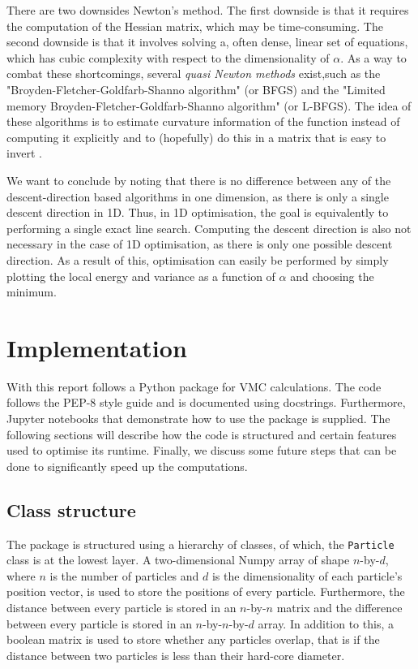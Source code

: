 \documentclass[11pt,a4paper]{article}
\numberwithin{equation}{section}
\begin{document}
There are two downsides Newton's method. The first downside is that it requires the computation of the Hessian matrix, which may be time-consuming. The second downside is that it involves solving a, often dense, linear set of equations, which has cubic complexity with respect to the dimensionality of $\alpha$. As a way to combat these shortcomings, several \emph{quasi Newton methods} exist,such as the "Broyden-Fletcher-Goldfarb-Shanno algorithm" (or BFGS) and the "Limited memory Broyden-Fletcher-Goldfarb-Shanno algorithm" (or L-BFGS). The idea of these algorithms is to estimate curvature information of the function instead of computing it explicitly and to (hopefully) do this in a matrix that is easy to invert \cite{nocedal.book}.

We want to conclude by noting that there is no difference between any of the descent-direction based algorithms in one dimension, as there is only a single descent direction in 1D. Thus, in 1D optimisation, the goal is equivalently to performing a single exact line search. Computing the descent direction is also not necessary in the case of 1D optimisation, as there is only one possible descent direction. As a result of this, optimisation can easily be performed by simply plotting the local energy and variance as a function of $\alpha$ and choosing the minimum.

\section{Implementation}
With this report follows a Python package for VMC calculations. The code follows the PEP-8 style guide and is documented using docstrings. Furthermore, Jupyter notebooks that demonstrate how to use the package is supplied. The following sections will describe how the code is structured and certain features used to optimise its runtime. Finally, we discuss some future steps that can be done to significantly speed up the computations.

\subsection{Class structure}
The package is structured using a hierarchy of classes, of which, the \texttt{Particle} class is at the lowest layer. A two-dimensional Numpy array of shape $n$-by-$d$, where $n$ is the number of particles and $d$ is the dimensionality of each particle's position vector, is used to store the positions of every particle. Furthermore, the distance between every particle is stored in an $n$-by-$n$ matrix and the difference between every particle is stored in an $n$-by-$n$-by-$d$ array. In addition to this, a boolean matrix is used to store whether any particles overlap, that is if the distance between two particles is less than their hard-core diameter. 
\end{document}
